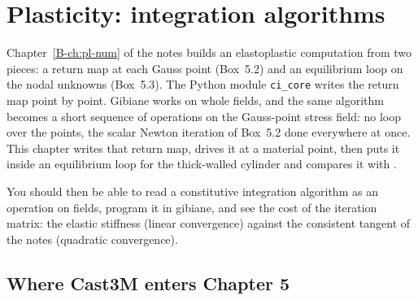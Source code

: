 \chapter{Plasticity: integration algorithms}\label{cc:ch5}


Chapter~\ref{B-ch:pl-num} of the notes builds an elastoplastic computation
from two pieces: a return map at each Gauss point (Box~5.2) and an
equilibrium loop on the nodal unknowns (Box~5.3). The Python module
\texttt{ci\_core} writes the return map point by point. Gibiane works on whole
fields, and the same algorithm becomes a short sequence of operations on the
Gauss-point stress field: no loop over the points, the scalar Newton
iteration of Box~5.2 done everywhere at once. This chapter writes that return
map, drives it at a material point, then puts it inside an equilibrium loop
for the thick-walled cylinder and compares it with .

You should then be able to read a constitutive integration algorithm as an
operation on fields, program it in gibiane, and see the cost of the iteration
matrix: the elastic stiffness (linear convergence) against the consistent
tangent of the notes (quadratic convergence).

\section{Where Cast3M enters Chapter 5}\label{cc:sec5-map}
%

